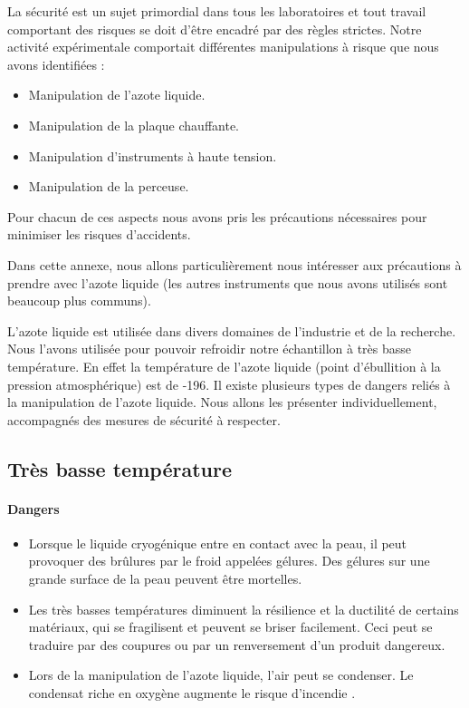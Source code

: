 La sécurité est un sujet primordial dans tous les laboratoires et tout travail comportant des risques se doit d'être encadré par des règles strictes. Notre activité expérimentale comportait différentes manipulations à risque que nous avons identifiées : 

\begin{itemize}
  \item Manipulation de l'azote liquide.
  \item Manipulation de la plaque chauffante.
  \item Manipulation d'instruments à haute tension.
  \item Manipulation de la perceuse.
\end{itemize}

\bigskip
Pour chacun de ces aspects nous avons pris les précautions nécessaires pour minimiser les risques d'accidents.

Dans cette annexe, nous allons particulièrement nous intéresser aux précautions à prendre avec l'azote liquide (les autres instruments que nous avons utilisés sont beaucoup plus communs).

L'azote liquide est utilisée dans divers domaines de l'industrie et de la recherche. Nous l'avons utilisée pour pouvoir refroidir notre échantillon à très basse température. En effet la température de l’azote liquide (point d’ébullition à la pression atmosphérique) est de -196\celsius{}. 
Il existe plusieurs types de dangers reliés à la manipulation de l'azote liquide. Nous allons les présenter individuellement, accompagnés des mesures de sécurité à respecter.

\subsection{Très basse température}

\paragraph{Dangers}

\begin{itemize}
  \item Lorsque le liquide cryogénique entre en contact avec la peau, il peut provoquer des 
brûlures par le froid appelées gélures. Des gélures sur une grande surface de la peau peuvent être mortelles. 
  \item Les très basses températures diminuent la résilience et la ductilité de certains 
matériaux, qui se fragilisent et peuvent se briser facilement. Ceci peut se traduire par des coupures ou par un renversement d'un produit dangereux.
  \item Lors de la manipulation de l'azote liquide, l’air peut se condenser. Le condensat riche en oxygène augmente le risque d'incendie .
\end{itemize}

